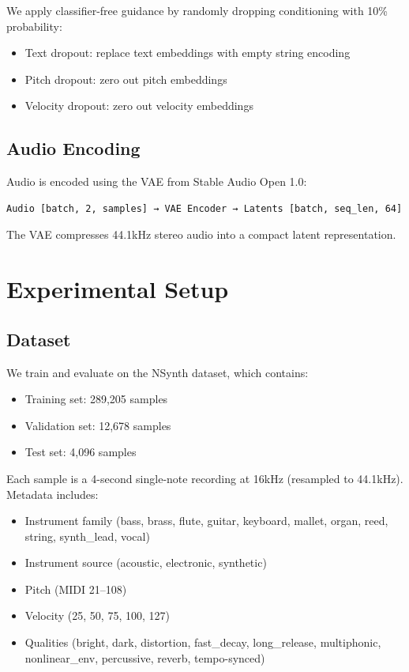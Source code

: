 \documentclass[11pt,a4paper]{article}
\begin{document}
We apply classifier-free guidance by randomly dropping conditioning with 10\% probability:
\begin{itemize}[leftmargin=1.5em]
    \item Text dropout: replace text embeddings with empty string encoding
    \item Pitch dropout: zero out pitch embeddings
    \item Velocity dropout: zero out velocity embeddings
\end{itemize}

\subsection{Audio Encoding}

Audio is encoded using the VAE from Stable Audio Open 1.0:

\begin{verbatim}
Audio [batch, 2, samples] → VAE Encoder → Latents [batch, seq_len, 64]
\end{verbatim}

The VAE compresses 44.1kHz stereo audio into a compact latent representation.

\section{Experimental Setup}

\subsection{Dataset}

We train and evaluate on the NSynth dataset, which contains:
\begin{itemize}[leftmargin=1.5em]
    \item Training set: 289,205 samples
    \item Validation set: 12,678 samples
    \item Test set: 4,096 samples
\end{itemize}

Each sample is a 4-second single-note recording at 16kHz (resampled to 44.1kHz). Metadata includes:
\begin{itemize}[leftmargin=1.5em]
    \item Instrument family (bass, brass, flute, guitar, keyboard, mallet, organ, reed, string, synth\_lead, vocal)
    \item Instrument source (acoustic, electronic, synthetic)
    \item Pitch (MIDI 21--108)
    \item Velocity (25, 50, 75, 100, 127)
    \item Qualities (bright, dark, distortion, fast\_decay, long\_release, multiphonic, nonlinear\_env, percussive, reverb, tempo-synced)
\end{itemize}
\end{document}
